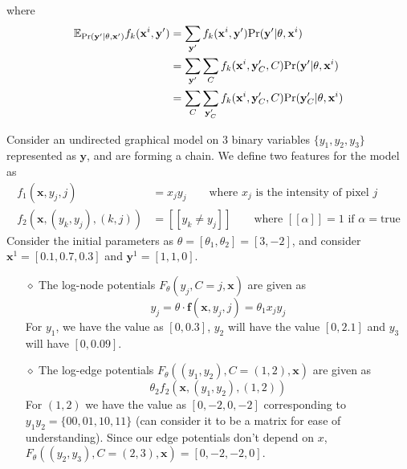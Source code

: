 where 
\begin{equation}
\begin{split}
	\mathbb{E}_{\text{Pr}(\mathbf y'| \theta, \mathbf x')} f_k(\mathbf x^i, \mathbf y') &= \sum_{\mathbf y'}  f_k(\mathbf x^i, \mathbf y')\text{Pr}(\mathbf y'|\theta, \mathbf x^i) \\
	&= \sum_{\mathbf y'} \sum_C f_k(\mathbf x^i, \mathbf y'_C, C)\text{Pr}(\mathbf y'|\theta, \mathbf x^i) \\
	&= \sum_C \sum_{\mathbf y_C'} f_k (\mathbf x^i, \mathbf y_C', C)\text{Pr}(\mathbf y_C'|\theta, \mathbf x^i)
\end{split}
\end{equation}
\begin{exmp}\label{exmp:i-1}
Consider an undirected graphical model on 3 binary variables $\{y_1, y_2, y_3\}$ represented as $\mathbf y$, and are forming a chain. We define two features for the model as
\[
\begin{split}
	f_1(\mathbf x, y_j, j) &= x_jy_j \qquad \text{where $x_j$ is the intensity of pixel $j$} \\
	f_2(\mathbf x, (y_k, y_j), (k,j)) &= [\![ y_k \neq y_j ]\!] \qquad \text{where $[\![\alpha]\!] = 1$ if $\alpha=$true}
\end{split}
\]
Consider the initial parameters as $\theta = [\theta_1, \theta_2] = [3,-2]$, and consider $\mathbf x^1 = [0.1, 0.7, 0.3]$ and $\mathbf y^1 = [1, 1, 0]$. \\
\begin{itemize}
	\item[$\diamond$] The log-node potentials $F_\theta(y_j, C=j, \mathbf x)$ are given as $$y_j = \theta \cdot \mathbf f(\mathbf x, y_j, j) = \theta_1 x_j y_j$$
	For $y_1$, we have the value as $[0, 0.3]$, $y_2$ will have the value $[0, 2.1]$ and $y_3$ will have $[0, 0.09]$.
	\item[$\diamond$] The log-edge potentials $F_\theta((y_1, y_2), C=(1,2), \mathbf x)$ are given as
	\[\theta_2f_2(\mathbf x, (y_1, y_2), (1,2))\]
	For $(1,2)$ we have the value as $[0, -2, 0, -2]$ corresponding to $y_1y_2 = \{00, 01, 10, 11\}$ (can consider it to be a matrix for ease of understanding). Since our edge potentials don't depend on $x$, $F_\theta((y_2,y_3), C=(2,3), \mathbf x) = [0, -2, -2, 0]$. 
\end{itemize}
\end{exmp}
